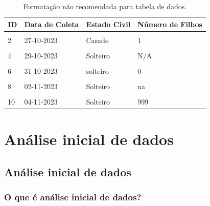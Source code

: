 \documentclass[
  a4paper,
]{book}
\begin{document}
\begin{table}

\caption{\label{tab:tabela-evite}Formatação não recomendada para tabela de dados.}
\centering
\begin{tabu} to 
\toprule
\textbf{ID} & \textbf{Data de Coleta} & \textbf{Estado Civil} & \textbf{Número de Filhos}\\
\midrule
{} &  &  & \\
2 & 27-10-2023 & Casado & 1\\
 &  &  & \\
4 & 29-10-2023 & Solteiro & N/A\\
 &  &  & \\
6 & 31-10-2023 & solteiro & 0\\
 &  &  & \\
8 & 02-11-2023 & Solteiro & na\\
 &  &  & \\
10 & 04-11-2023 & Solteiro & 999\\
\bottomrule
\end{tabu}
\end{table}

\hypertarget{analise-inicial-dados}{%
\chapter{\texorpdfstring{\textbf{Análise inicial de dados}}{Análise inicial de dados}}\label{analise-inicial-dados}}

\hypertarget{analise-inicial}{%
\section{Análise inicial de dados}\label{analise-inicial}}

\hypertarget{o-que-uxe9-anuxe1lise-inicial-de-dados}{%
\subsection{O que é análise inicial de dados?}\label{o-que-uxe9-anuxe1lise-inicial-de-dados}}
\end{document}
